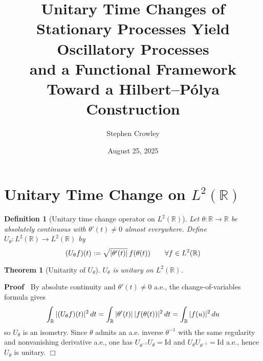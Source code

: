 \documentclass{article}
\newcommand{\assign}{:=}
\newenvironment{proof}{\noindent\textbf{Proof\ }}{\hspace*{\fill}$\Box$\medskip}
\newtheorem{definition}{Definition}
\newtheorem{theorem}{Theorem}
\begin{document}
\title{
  Unitary Time Changes of Stationary Processes Yield Oscillatory Processes\\
  and a Functional Framework Toward a Hilbert--P{\'o}lya Construction
}

\author{Stephen Crowley}

\date{August 25, 2025}

\maketitle

{\tableofcontents}

\section{Unitary Time Change on $L^2 (\mathbb{R})$}

\begin{definition}
  [Unitary time change operator on $L^2 (\mathbb{R})$] Let $\theta :
  \mathbb{R} \to \mathbb{R}$ be absolutely continuous with $\theta' (t) \neq
  0$ almost everywhere. Define $U_{\theta} : L^2 (\mathbb{R}) \to L^2
  (\mathbb{R})$ by
  \begin{equation}
    (U_{\theta} f) (t) \assign \sqrt{| \theta' (t) |}  \hspace{0.17em} f
    (\theta (t))  \qquad \forall f \in L^2 (\mathbb{R})
  \end{equation}
\end{definition}

\begin{theorem}
  [Unitarity of $U_{\theta}$] $U_{\theta}$ is unitary on $L^2 (\mathbb{R})$.
\end{theorem}

\begin{proof}
  By absolute continuity and $\theta' (t) \neq 0$ a.e., the
  change-of-variables formula gives
  \begin{equation}
    \int_{\mathbb{R}} | (U_{\theta} f) (t) |^2 \hspace{0.17em} dt =
    \int_{\mathbb{R}} | \theta' (t) | \hspace{0.17em} |f (\theta (t)) |^2
    \hspace{0.17em} dt = \int_{\mathbb{R}} |f (u) |^2  \hspace{0.17em} du
  \end{equation}
  so $U_{\theta}$ is an isometry. Since $\theta$ admits an a.e. inverse
  $\theta^{- 1}$ with the same regularity and nonvanishing derivative a.e.,
  one has $U_{\theta^{- 1}} U_{\theta} = \mathrm{Id}$ and $U_{\theta}
  U_{\theta^{- 1}} = \mathrm{Id}$ a.e., hence $U_{\theta}$ is unitary.
\end{proof}
\end{document}
